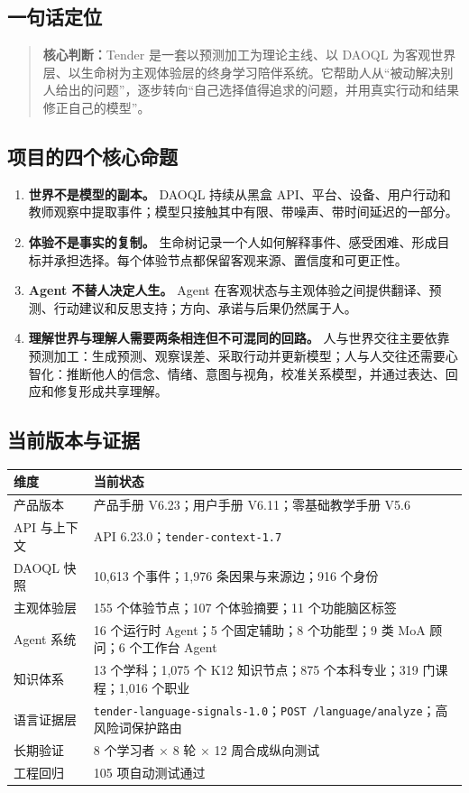 \documentclass[UTF8,a4paper,11pt]{ctexart}
\newcommand{\keypoint}[1]{\begin{quote}\noindent\textbf{\color{TenderBlue}核心判断：}#1\end{quote}}
\begin{document}
\subsection{一句话定位}

\keypoint{Tender 是一套以预测加工为理论主线、以 DAOQL 为客观世界层、以生命树为主观体验层的终身学习陪伴系统。它帮助人从“被动解决别人给出的问题”，逐步转向“自己选择值得追求的问题，并用真实行动和结果修正自己的模型”。}

\subsection{项目的四个核心命题}

\begin{enumerate}
\item \textbf{世界不是模型的副本。} DAOQL 持续从黑盒 API、平台、设备、用户行动和教师观察中提取事件；模型只接触其中有限、带噪声、带时间延迟的一部分。
\item \textbf{体验不是事实的复制。} 生命树记录一个人如何解释事件、感受困难、形成目标并承担选择。每个体验节点都保留客观来源、置信度和可更正性。
\item \textbf{Agent 不替人决定人生。} Agent 在客观状态与主观体验之间提供翻译、预测、行动建议和反思支持；方向、承诺与后果仍然属于人。
\item \textbf{理解世界与理解人需要两条相连但不可混同的回路。} 人与世界交往主要依靠预测加工：生成预测、观察误差、采取行动并更新模型；人与人交往还需要心智化：推断他人的信念、情绪、意图与视角，校准关系模型，并通过表达、回应和修复形成共享理解。
\end{enumerate}

\subsection{当前版本与证据}

\begin{center}
\begin{tabularx}{\textwidth}{@{}p{4.6cm}X@{}}
\toprule
\textbf{维度} & \textbf{当前状态} \\
\midrule
产品版本 & 产品手册 V6.23；用户手册 V6.11；零基础教学手册 V5.6 \\
API 与上下文 & API 6.23.0；\texttt{tender-context-1.7} \\
DAOQL 快照 & 10,613 个事件；1,976 条因果与来源边；916 个身份 \\
主观体验层 & 155 个体验节点；107 个体验摘要；11 个功能脑区标签 \\
Agent 系统 & 16 个运行时 Agent；5 个固定辅助；8 个功能型；9 类 MoA 顾问；6 个工作台 Agent \\
知识体系 & 13 个学科；1,075 个 K12 知识节点；875 个本科专业；319 门课程；1,016 个职业 \\
语言证据层 & \texttt{tender-language-signals-1.0}；\texttt{POST /language/analyze}；高风险词保护路由 \\
长期验证 & 8 个学习者 × 8 轮 × 12 周合成纵向测试 \\
工程回归 & 105 项自动测试通过 \\
\bottomrule
\end{tabularx}
\end{center}
\end{document}
